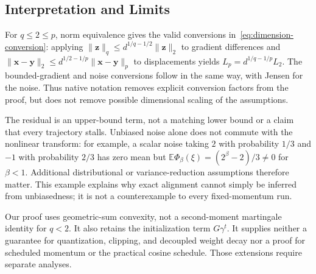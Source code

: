\documentclass{article}
\begin{document}
\subsection{Interpretation and Limits}
For $q\le2\le p$, norm equivalence gives the valid conversions in~\eqref{eq:dimension-conversion}: applying $\|\mathbf{z}\|_q\le d^{1/q-1/2}\|\mathbf{z}\|_2$ to gradient differences and $\|\mathbf{x}-\mathbf{y}\|_2\le d^{1/2-1/p}\|\mathbf{x}-\mathbf{y}\|_p$ to displacements yields $L_p=d^{1/q-1/p}L_2$. The bounded-gradient and noise conversions follow in the same way, with Jensen for the noise. Thus native notation removes explicit conversion factors from the proof, but does not remove possible dimensional scaling of the assumptions.

The residual is an upper-bound term, not a matching lower bound or a claim that every trajectory stalls. Unbiased noise alone does not commute with the nonlinear transform: for example, a scalar noise taking $2$ with probability $1/3$ and $-1$ with probability $2/3$ has zero mean but $\mathbb E\Phi_\beta(\xi)=(2^\beta-2)/3\ne0$ for $\beta<1$. Additional distributional or variance-reduction assumptions therefore matter. This example explains why exact alignment cannot simply be inferred from unbiasedness; it is not a counterexample to every fixed-momentum run.

Our proof uses geometric-sum convexity, not a second-moment martingale identity for $q<2$. It also retains the initialization term $G\gamma^t$. It supplies neither a guarantee for quantization, clipping, and decoupled weight decay nor a proof for scheduled momentum or the practical cosine schedule. Those extensions require separate analyses.
\end{document}
